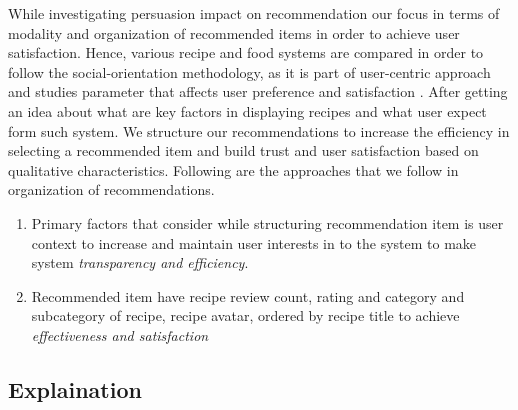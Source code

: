 While investigating persuasion impact on recommendation our focus in terms of modality and organization of recommended items in order to achieve user satisfaction.  Hence, various recipe and food systems are compared in order to follow the social-orientation methodology, as it is part of user-centric approach and studies parameter that affects user preference and satisfaction \cite{ swearingen2002interaction}. After getting an idea about what are key factors in displaying recipes and what user expect form such system.  We structure our recommendations to increase the efficiency in selecting a recommended item and build trust and user satisfaction based on qualitative characteristics. Following are the approaches that we follow in organization of recommendations.

\begin{enumerate}
	\item Primary factors that consider while structuring recommendation item is user context to increase and maintain user interests in to the system to make system \textit{transparency and efficiency}. 
	
	\item Recommended item have recipe review count, rating and category and subcategory of recipe, recipe avatar, ordered by recipe title to achieve \textit{ effectiveness and satisfaction}
\end{enumerate}

\subsection{Explaination} \label{ch4_persuasion_explaination}

